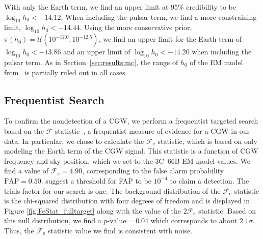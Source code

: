 With only the Earth term, we find an upper limit at 95\% credibility to be $\log_{10} h_0 < -14.12$. 
When including the pulsar term, we find a more constraining limit, $\log_{10} h_0 < -14.44$. 
Using the more conservative prior, $\pi(h_0)=\mathcal{U}(10^{-17.0},10^{-12.5})$, we find an upper limit for the Earth term of $\log_{10} h_0 < -13.86$ and an upper limit of $\log_{10} h_0 < -14.20$ when including the pulsar term. As in Section~\ref{sec:results:mc}, the range of $h_0$ of the EM model from~\citet{IguchiOkuda2010} is partially ruled out in all cases.

\subsection{\label{sec:results:frequentist} Frequentist Search}

To confirm the nondetection of a CGW, we perform a frequentist targeted search based on the $\mathcal{F}$ statistic~\citep{EllisSiemens2012}, a frequentist measure of evidence for a CGW in our data. 
In particular, we chose to calculate the $\mathcal{F}_\text{e}$ statistic, which is based on only modeling the Earth term of the CGW signal. 
This statistic is a function of CGW frequency and sky position, which we set to the 3C~66B EM model values.
We find a value of $\mathcal{F}_\text{e}=4.90$, corresponding to the false alarm probability $\text{FAP}=0.50$. 
\citet{EllisSiemens2012} suggest a threshold for FAP to be $10^{-4}$ to claim a detection.
The trials factor for our search is one.
The background distribution of the $\mathcal{F}_\text{e}$ statistic is the chi-squared distribution with four degrees of freedom and is displayed in Figure \ref{fig:FeStat_fulltarget} along with the value of the $2\mathcal{F}_\text{e}$ statistic. 
Based on this null distribution, we find a $p\text{-value} = 0.04$ which corresponds to about $2.1 \sigma$.
Thus, the $\mathcal{F}_\text{e}$ statistic value we find is consistent with noise. 

